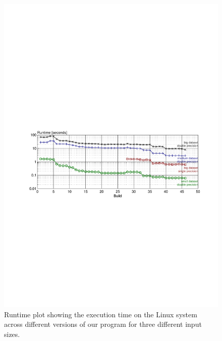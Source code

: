 \begin{figure}\centering
  \includegraphics[scale = 1, trim={7cm 11cm 6cm 14cm}]{graphics/runtime_plot.pdf}
  \caption{Runtime plot showing the execution time on the Linux system across different versions of our program for three different input sizes.\label{runtime}}
\end{figure}

